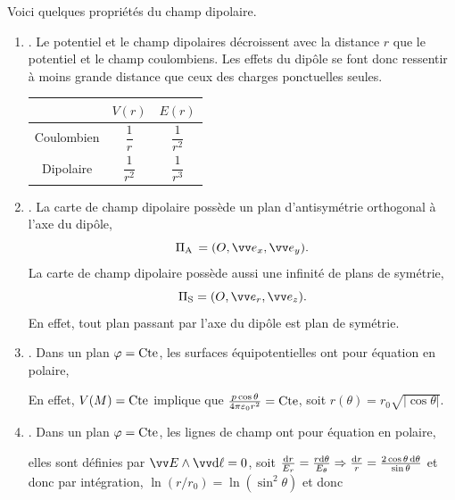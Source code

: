 \documentclass[12pt,fancy]{cours}
\begin{document}
 Voici quelques propriétés du champ dipolaire.
\begin{enumerate}

\item
{}. Le potentiel et le champ dipolaires décroissent  avec la distance $r$ que le potentiel et le champ coulombiens. Les effets du dipôle se font donc ressentir à moins grande distance que ceux des charges ponctuelles seules.
\begin{center}
\renewcommand{\arraystretch}{2}
\begin{tabular}{|c|c|c|}
\hline
& $V(r)$ & $E(r)$ \\
\hline
Coulombien  & $\dfrac{1}{r}$ &  $\dfrac{1}{r^2}$\\
\hline
 Dipolaire & $\dfrac{1}{r^2}$ &  $\dfrac{1}{r^3}$  \\
 \hline
\end{tabular}
\end{center}
\item {}. La carte de champ dipolaire possède un plan d'antisymétrie orthogonal à l'axe du dipôle,
\begin{equation}
\Pi_{\rm A}\, = (O, \ex, \ey).
\end{equation}
La carte de champ dipolaire possède aussi une infinité de plans de symétrie,
\begin{equation}
\Pi_{\rm S} = (O, \er, \ez).
\end{equation}
En effet, tout plan passant par l'axe du dipôle est plan de symétrie.

\item {}. Dans un plan $\varphi = \text{Cte}$, les surfaces équipotentielles ont pour équation en polaire,
  \begin{demo}
  En effet, $V(M) = \text{Cte}$ implique que $\frac{p\cos\theta}{4\pi\varepsilon_0 r^2} = \text{Cte}$, soit $r(\theta) = r_0 \sqrt{|\cos \theta|}$.
  \end{demo}
\item {}. Dans un plan $\varphi = \text{Cte}$, les lignes de champ ont pour équation en polaire,
  \begin{demo}
  elles sont définies par $\Vec{E} \pv \Vec{\d \ell} = 0$, soit $\frac{\mathrm{d} r}{E_r} = \frac{r \mathrm{d} \theta}{E_\theta} \Rightarrow \frac{\mathrm{d} r}{r} = \frac{2 \cos \theta\, \mathrm{d} \theta}{\sin \theta}$ et donc par intégration, $\ln(r/r_0) = \ln(\sin^2\theta)$ et donc
  \end{demo}
\end{enumerate}
\end{document}
